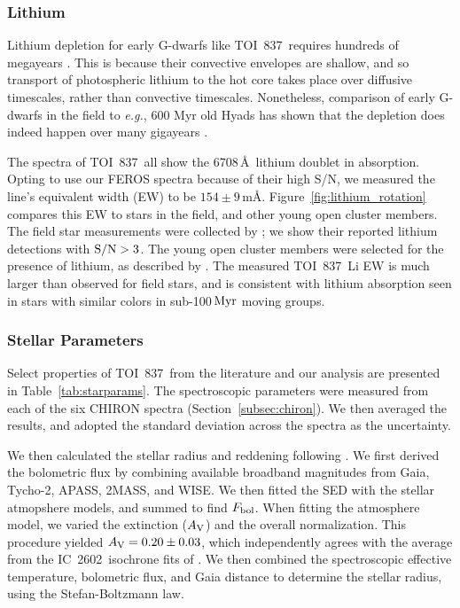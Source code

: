 \documentclass[12pt,twocolumn,tighten]{aastex63}
\newcommand{\tn}{TOI~837} %
\newcommand{\cn}{IC~2602} %
\begin{document}
\subsubsection{Lithium}

Lithium depletion for early G-dwarfs like \tn\ requires hundreds of
megayears \citep{soderblom_ages_2014}. This is because their
convective envelopes are shallow, and so transport of photospheric
lithium to the hot core takes place over diffusive timescales, rather
than convective timescales.  Nonetheless, comparison of early G-dwarfs
in the field to {\it e.g.}, 600 Myr old Hyads has shown that the
depletion does indeed happen over many gigayears
\citep{berger_identifying_2018}.

The spectra of \tn\ all show the 6708$\,$\AA\ lithium doublet in
absorption. Opting to use our FEROS spectra because of their high S/N,
we measured the line's equivalent width (EW) to be $154 \pm 9 \,
$m\AA.  Figure~\ref{fig:lithium_rotation} compares this EW to stars in
the field, and other young open cluster members.  The field star
measurements were collected by \citet{berger_identifying_2018}; we
show their reported lithium detections with ${\rm S/N}>3$.  The young
open cluster members were selected for the presence of lithium, as
described by \citet{randich_gaiaeso_2018}.  The measured \tn\ Li EW is
much larger than observed for field stars, and is consistent with
lithium absorption seen in stars with similar colors in sub-100$\,{\rm
Myr}$ moving groups.


\subsubsection{Stellar Parameters}
\label{subsec:starparams}

Select properties of \tn\ from the literature and our analysis are
presented in Table~\ref{tab:starparams}.  The spectroscopic parameters
were measured from each of the six CHIRON spectra
(Section~\ref{subsec:chiron}). We then averaged the results, and
adopted the standard deviation across the spectra as the uncertainty.

We then calculated the stellar radius and reddening following
\citet{stassun_accurate_2017}.  We first derived the bolometric flux
by combining available broadband magnitudes from Gaia, Tycho-2, APASS,
2MASS, and WISE.  We then fitted the SED with the
\citet{kurucz_atlas12_2013} stellar atmopshere models, and summed to
find $F_{\rm bol}$.  When fitting the atmosphere model, we varied the
extinction ($A_{\rm V}$) and the overall normalization.  This
procedure yielded $A_{\rm V} = 0.20\pm0.03$, which independently
agrees with the average from the \cn\ isochrone fits of
\citet{randich_gaiaeso_2018}.
We then combined the spectroscopic effective temperature, bolometric
flux, and Gaia distance to determine the stellar radius, using the
Stefan-Boltzmann law.
\end{document}
